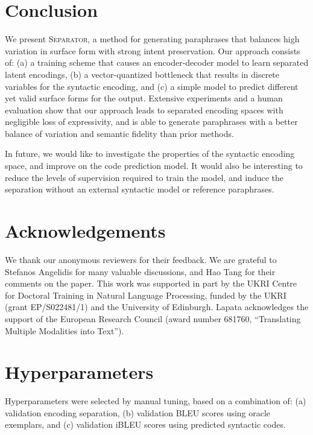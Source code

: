 \documentclass[11pt,a4paper]{article}
\begin{document}
\section{Conclusion}

We present \textsc{Separator}, a method for generating paraphrases
that balances high variation in surface form with strong intent
preservation. Our approach consists of: (a) a training scheme that
causes an encoder-decoder model to learn separated latent encodings,
(b) a vector-quantized bottleneck that results in discrete variables
for the syntactic encoding, and (c) a simple model to predict
different yet valid surface forms for the output. Extensive
experiments and a human evaluation show that our approach leads to
separated encoding spaces with negligible loss of expressivity, and is
able to generate paraphrases with a better balance of variation and
semantic fidelity than prior methods.

In future, we would like to investigate the properties of the
syntactic encoding space, and improve on the code prediction model. It
would also be interesting to reduce the levels of supervision required
to train the model, and induce the separation without an external
syntactic  model or reference paraphrases. 

\section*{Acknowledgements}

We thank our anonymous reviewers for their feedback. We are grateful
to Stefanos Angelidis for many valuable discussions, and Hao Tang for
their comments on the paper. This work was supported in part by the
UKRI Centre for Doctoral Training in Natural Language Processing,
funded by the UKRI (grant EP/S022481/1) and the University of
Edinburgh. Lapata acknowledges the support of the European Research
Council (award number 681760, ``Translating Multiple Modalities into
Text'').




\clearpage
\appendix

\section{Hyperparameters}
\label{app:hyperparams}

Hyperparameters were selected by manual tuning, based on a combination
of: (a) validation encoding separation, (b) validation BLEU scores
using oracle exemplars, and (c) validation iBLEU scores using
predicted syntactic codes.
\end{document}
